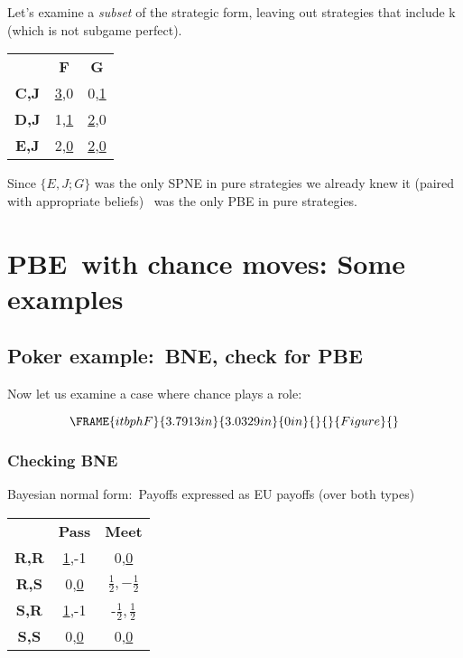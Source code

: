 \documentclass{article}
\begin{document}
Let's examine a \textit{subset} of the strategic form, leaving out
strategies that include k (which is not subgame perfect).

\begin{tabular}{ccc}
& \textbf{F} & \textbf{G} \\ 
\textbf{C,J} & \underline{3},0 & 0,\underline{1} \\ 
\textbf{D,J} & 1,\underline{1} & \underline{2},0 \\ 
\textbf{E,J} & 2,\underline{0} & \underline{2},\underline{0}%
\end{tabular}

Since $\{E,J;G\}$ was the only SPNE in pure strategies we already knew it
(paired with appropriate beliefs) \ was the only PBE in pure strategies.

\bigskip

\section{PBE\ with chance moves: Some examples}

\subsection{Poker example:\ BNE, check for PBE}

Now let us examine a case where chance plays a role:\bigskip

\begin{equation}
\FRAME{itbphF}{3.7913in}{3.0329in}{0in}{}{}{Figure}{\special{language
"Scientific Word";type "GRAPHIC";maintain-aspect-ratio TRUE;display
"USEDEF";valid_file "T";width 3.7913in;height 3.0329in;depth
0in;original-width 4.6799in;original-height 3.584in;cropleft "0";croptop
"1";cropright "1";cropbottom "0";tempfilename
'JSY1RZ0F.wmf';tempfile-properties "XPR";}}
\end{equation}

\subsubsection{Checking BNE}

Bayesian normal form:\ Payoffs expressed as EU payoffs (over both types)

\begin{tabular}{ccc}
& \textbf{Pass} & \textbf{Meet} \\ 
\textbf{R,R} & \underline{1},-1 & 0,\underline{0} \\ 
\textbf{R,S} & 0,\underline{0} & \underline{$\frac{1}{2}$}$,-\frac{1}{2}$ \\ 
\textbf{S,R} & \underline{1},-1 & -$\frac{1}{2},$\underline{$\frac{1}{2}$}
\\ 
\textbf{S,S} & 0,\underline{0} & 0,\underline{0}%
\end{tabular}
\end{document}
